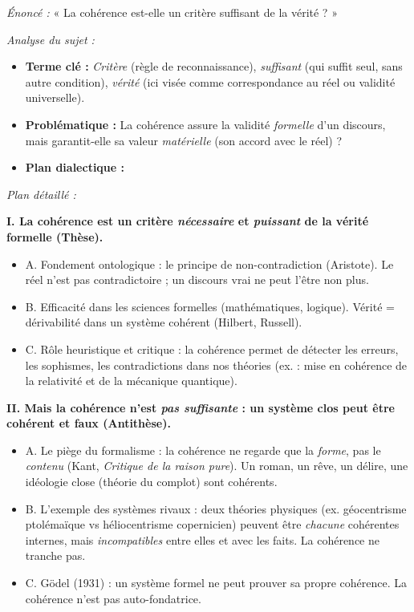 \documentclass[11pt]{article}
\begin{document}
\begin{exoresolu}
\emph{Énoncé :} « La cohérence est-elle un critère suffisant de la vérité ? »

\emph{Analyse du sujet :}
\begin{itemize}
    \item \textbf{Terme clé :} \emph{Critère} (règle de reconnaissance), \emph{suffisant} (qui suffit seul, sans autre condition), \emph{vérité} (ici visée comme correspondance au réel ou validité universelle).
    \item \textbf{Problématique :} La cohérence assure la validité \emph{formelle} d'un discours, mais garantit-elle sa valeur \emph{matérielle} (son accord avec le réel) ?
    \item \textbf{Plan dialectique :}
\end{itemize}

\emph{Plan détaillé :}

\textbf{I. La cohérence est un critère \emph{nécessaire} et \emph{puissant} de la vérité formelle (Thèse).}
\begin{itemize}
    \item A. Fondement ontologique : le principe de non-contradiction (Aristote). Le réel n'est pas contradictoire ; un discours vrai ne peut l'être non plus.
    \item B. Efficacité dans les sciences formelles (mathématiques, logique). Vérité = dérivabilité dans un système cohérent (Hilbert, Russell).
    \item C. Rôle heuristique et critique : la cohérence permet de détecter les erreurs, les sophismes, les contradictions dans nos théories (ex. : mise en cohérence de la relativité et de la mécanique quantique).
\end{itemize}

\textbf{II. Mais la cohérence n'est \emph{pas suffisante} : un système clos peut être cohérent et faux (Antithèse).}
\begin{itemize}
    \item A. Le piège du formalisme : la cohérence ne regarde que la \emph{forme}, pas le \emph{contenu} (Kant, \emph{Critique de la raison pure}). Un roman, un rêve, un délire, une idéologie close (théorie du complot) sont cohérents.
    \item B. L'exemple des systèmes rivaux : deux théories physiques (ex. géocentrisme ptolémaïque vs héliocentrisme copernicien) peuvent être \emph{chacune} cohérentes internes, mais \emph{incompatibles} entre elles et avec les faits. La cohérence ne tranche pas.
    \item C. Gödel (1931) : un système formel ne peut prouver sa propre cohérence. La cohérence n'est pas auto-fondatrice.
\end{itemize}


\end{exoresolu}
\end{document}
